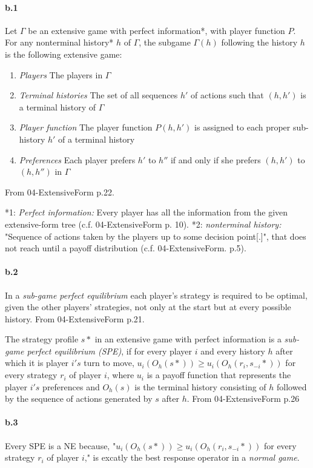 \paragraph{b.1}
Let $\Gamma$ be an extensive game with perfect information*, with player function $P$. For any nonterminal history* $h$ of $\Gamma$, the subgame $\Gamma(h)$ following the history $h$ is the following extensive game:
\begin{enumerate}
\item \textit{Players} The players in $\Gamma$
\item \textit{Terminal histories} The set of all sequences $h'$ of actions such that $(h,h')$ is a terminal history of $\Gamma$
\item \textit{Player function} The player function $P(h,h')$ is assigned to each proper sub-history $h'$ of a terminal history
\item \textit{Preferences} Each player prefers $h'$ to $h''$ if and only if she prefers $(h,h')$ to $(h,h'')$ in $\Gamma$
\end{enumerate}
From 04-ExtensiveForm p.22. 

*1: \textit{Perfect information:} Every player has all the information from the given extensive-form tree (c.f. 04-ExtensiveForm p. 10).
*2: \textit{nonterminal history:} "Sequence of actions taken by the players up to some decision point[.]", that does not reach until a payoff distribution (c.f. 04-ExtensiveForm. p.5).

\paragraph{b.2}
\label{def:SPE}
In a \textit{sub-game perfect equilibrium} each player's strategy is required to be optimal, given the other players' strategies, not only at the start but at every possible history. From 04-ExtensiveForm p.21.

The strategy profile $s*$ in an extensive game with perfect information is a \textit{sub-game perfect equilibrium (SPE)}, if for every player $i$ and every history $h$ after which it is player $i's$ turn to move,
$u_i(O_h(s*)) \geq u_i(O_h(r_i,s_{-i}*))$ for every strategy $r_i$ of player $i$,
where $u_i$ is a payoff function that represents the player $i's$ preferences and $O_h(s)$ is the terminal history consisting of $h$ followed by the sequence of actions generated by $s$ after $h$.
From 04-ExtensiveForm p.26

\paragraph{b.3}
Every SPE is a NE because,
"$u_i(O_h(s*)) \geq u_i(O_h(r_i,s_{-i}*))$ for every strategy $r_i$ of player $i$,"
is excatly the best response operator in a \textit{normal game}.


